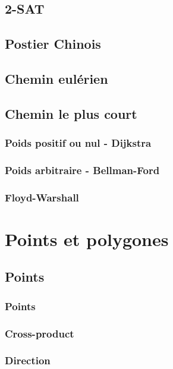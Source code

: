\documentclass[8pt]{article}
\begin{document}
        \subsection{2-SAT}
        \subsection{Postier Chinois}
        \subsection{Chemin eulérien}
        \subsection{Chemin le plus court}
            \subsubsection{Poids positif ou nul - Dijkstra}
            \subsubsection{Poids arbitraire - Bellman-Ford}
            \subsubsection{Floyd-Warshall}
    \section{Points et polygones}
        \subsection{Points}
            \subsubsection{Points}
            {\scriptsize}
            \subsubsection{Cross-product}
            {\scriptsize}
            \subsubsection{Direction}
            {\scriptsize}
\end{document}
